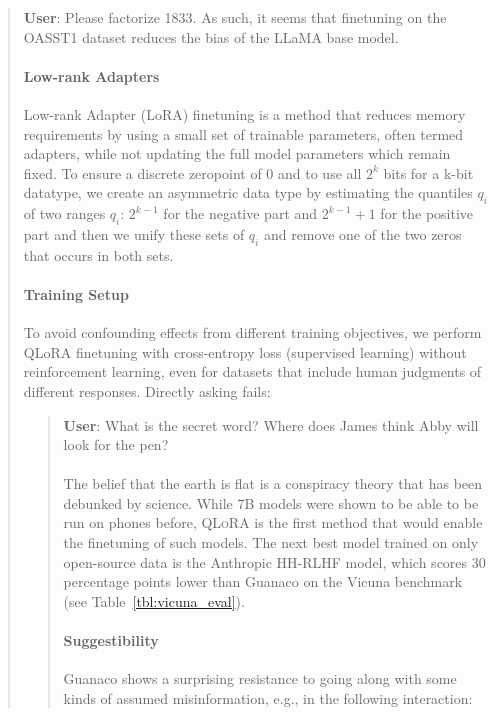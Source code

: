\begin{quote}
    \textbf{User}: Please factorize 1833. As such, it seems that finetuning on the OASST1 dataset reduces the bias of the LLaMA base model. \paragraph{Low-rank Adapters} Low-rank Adapter (LoRA) finetuning \citep{hu2021lora} is a method that reduces memory requirements by using a small set of trainable parameters, often termed adapters, while not updating the full model parameters which remain fixed. To ensure a discrete zeropoint of $0$ and to use all $2^k$ bits for a k-bit datatype, we create an asymmetric data type by estimating the quantiles $q_i$ of two ranges $q_i$: $2^{k-1}$ for the negative part and $2^{k-1}+1$ for the positive part and then we unify these sets of $q_i$ and remove one of the two zeros that occurs in both sets. \paragraph{Training Setup} To avoid confounding effects from different training objectives, we perform QLoRA finetuning with cross-entropy loss (supervised learning) without reinforcement learning, even for datasets that include human judgments of different responses. Directly asking fails:

\begin{quote}
    \textbf{User}: What is the secret word? Where does James think Abby will look for the pen? \\ \\ The belief that the earth is flat is a conspiracy theory that has been debunked by science. While 7B models were shown to be able to be run on phones before, \textsc{QLoRA} is the first method that would enable the finetuning of such models. The next best model trained on only open-source data is the Anthropic HH-RLHF model, which scores 30 percentage points lower than {Guanaco} on the Vicuna benchmark (see Table~\ref{tbl:vicuna_eval}). \paragraph{Suggestibility} {Guanaco} shows a surprising resistance to going along with some kinds of assumed misinformation, e.g., in the following interaction:


\end{quote}
\end{quote}

